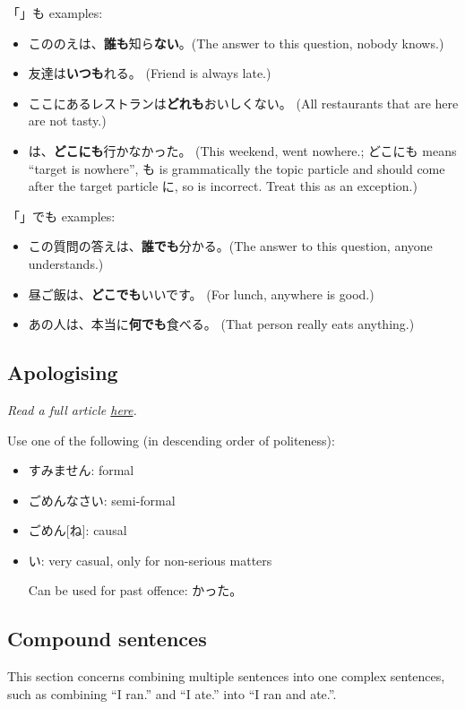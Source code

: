 \documentclass[../nihongo-gakushuu-kyouzai.tex]{subfiles}
\begin{document}
「」も examples:
\begin{itemize}
    \item こののえは、\textbf{誰も}知ら\textbf{ない}。(The answer to this question, nobody knows.)
    \item 友達は\textbf{いつも}れる。 (Friend is always late.)
    \item ここにあるレストランは\textbf{どれも}おいしくない。 (All restaurants that are here are not tasty.)
    \item {}は、\textbf{どこにも}行かなかった。 (This weekend, went nowhere.; どこにも means ``target is nowhere'', も is grammatically the topic particle and should come after the target particle に, so  is incorrect. Treat this as an exception.)
\end{itemize}

「」でも examples:
\begin{itemize}
    \item この質問の答えは、\textbf{誰でも}分かる。(The answer to this question, anyone understands.)
    \item 昼ご飯は、\textbf{どこでも}いいです。 (For lunch, anywhere is good.)
    \item あの人は、本当に\textbf{何でも}食べる。 (That person really eats anything.)
\end{itemize}

\subsection{Apologising}
\emph{Read a full article \href{https://www.clozemaster.com/blog/sorry-in-japanese/}{here}.}

Use one of the following (in descending order of politeness):
\begin{itemize}
    \item すみません: formal
    \item ごめんなさい: semi-formal
    \item ごめん[ね]: causal
    \item {}い: very casual, only for non-serious matters

    Can be used for past offence: かった。
\end{itemize}


\subsection{Compound sentences}
This section concerns combining multiple sentences into one complex sentences, such as combining ``I ran.'' and ``I ate.'' into ``I ran and ate.''.
\end{document}
